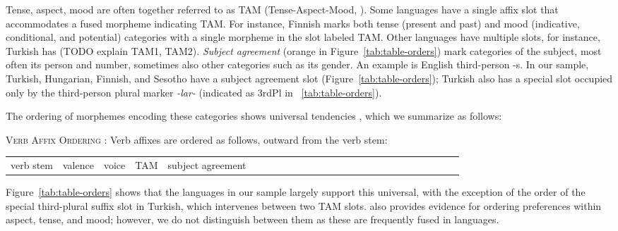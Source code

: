 \documentclass[11pt,letterpaper]{article}
\begin{document}
Tense, aspect, mood are often together referred to as TAM (Tense-Aspect-Mood, \citep{bybee1994the, wals-69}).
Some languages have a single affix slot that accommodates a fused morpheme indicating TAM.
For instance, Finnish marks both tense (present and past) and mood (indicative, conditional, and potential) categories with a single morpheme in the slot labeled TAM.
Other languages have multiple slots, for instance, Turkish has (TODO explain TAM1, TAM2).
\textit{Subject agreement} (orange in Figure~\ref{tab:table-orders}) mark categories of the subject, most often its person and number, sometimes also other categories such as its gender.
An example is English third-person -s.
In our sample, Turkish, Hungarian, Finnish, and Sesotho have a subject agreement slot (Figure~\ref{tab:table-orders}); Turkish also has a special slot occupied only by the third-person plural marker \textit{-lar-} (indicated as 3rdPl in ~\ref{tab:table-orders}).

The ordering of morphemes encoding these categories shows universal tendencies \citep{bybee-morphology-1985}, which we summarize as follows:


\begin{adjustwidth}{6em}{6em}
\textsc{Verb Affix Ordering} \citep{bybee-morphology-1985}:
Verb affixes are ordered as follows, outward from the verb stem:

\begin{tabular}{llllllllllllllllllllllllll}
verb stem & valence & voice & TAM & subject agreement
\end{tabular}
\end{adjustwidth}


Figure~\ref{tab:table-orders} shows that the languages in our sample largely support this universal, with the exception of the order of the special third-plural suffix slot in Turkish, which intervenes between two TAM slots.
\citet{bybee-morphology-1985} also provides evidence for ordering preferences within aspect, tense, and mood; however, we do not distinguish between them as these are frequently fused in languages.
\end{document}
